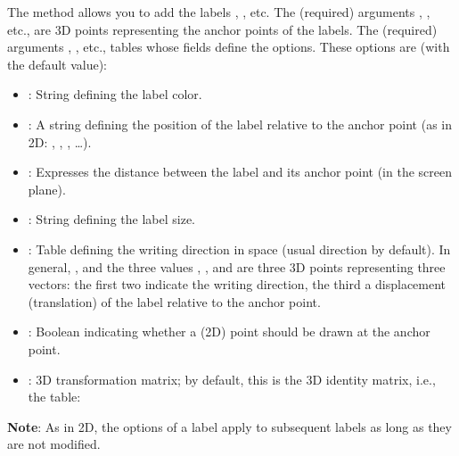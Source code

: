 The  method allows you to add the labels , , etc. The (required) arguments , , etc., are 3D points representing the anchor points of the labels. The (required) arguments , , etc., tables whose fields define the options. These options are (with the default value):
\begin{itemize}
    \item {}: String defining the label color.
    \item {}: A string defining the position of the label relative to the anchor point (as in 2D: , , , \ldots).
    \item {}: Expresses the distance between the label and its anchor point (in the screen plane).
    \item {}: String defining the label size.
    \item {}: Table defining the writing direction in space (usual direction by default).
In general, , and the three values ​​, , and  are three 3D points representing three vectors: the first two indicate the writing direction, the third a displacement (translation) of the label relative to the anchor point.
    \item {}: Boolean indicating whether a (2D) point should be drawn at the anchor point.
    \item {}: 3D transformation matrix; by default, this is the 3D identity matrix, i.e., the table: 
\end{itemize}

\textbf{Note}: As in 2D, the options of a label apply to subsequent labels as long as they are not modified.


